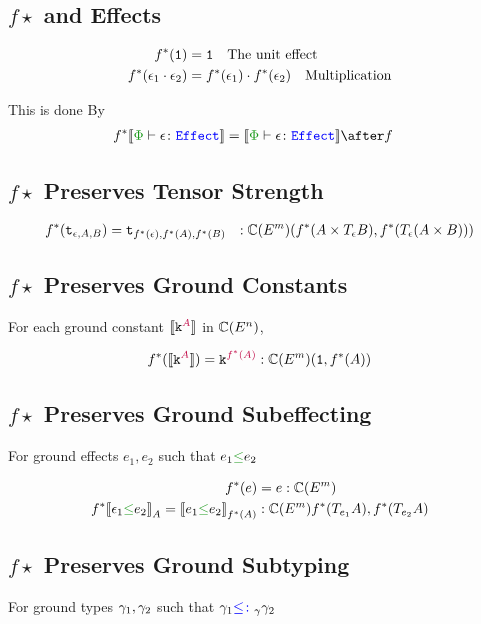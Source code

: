 \subsection{$f\star$ and Effects}
\begin{align*}
    f^*(\texttt{1}) &= \texttt{1} \quad\text{The unit effect}\\
    f^*(\epsilon_1\cdot\epsilon_2) &= f^*(\epsilon_1)\cdot f^*(\epsilon_2)\quad\text{Multiplication}\\
\end{align*}

This is done By
\begin{align*}
    f\star\deno{\typerelation{\P}{\e}{\effect}} & = \deno{\typerelation{\P}{\e}{\effect}}\after f
\end{align*}

\subsection{$f\star$ Preserves Tensor Strength}
\begin{align*}
    f^*(\texttt{t}_{\epsilon, A, B}) &= \texttt{t}_{f^*(\epsilon), f^*(A), f^*(B)} &: \mathbb{C}(E^m)(f^*(A\times T_{\epsilon}{B}), f^*(T_{\epsilon}{(A\times B)}))
\end{align*}
\subsection{$f\star$ Preserves Ground Constants}
For each ground constant ${\bf [\![}\texttt{k}^{\color{purple} A}{\bf ]\!]}$ in $\mathbb{C}(E^n)$,

\begin{align*}
    f^*({\bf [\![}\texttt{k}^{\color{purple} A}{\bf ]\!]}) = \texttt{k}^{\color{purple} f^*(A)} : \mathbb{C}(E^m)(\texttt{1}, f^*(A))
\end{align*}
\subsection{$f\star$ Preserves Ground Subeffecting}
For ground effects $e_1, e_2$ such that $e_1\subeffect e_2$



\begin{align*}
    f\star(e) & = e: \C(E^m)\\
    f\star\db{\e_1\subeffect e_2}_A = \db{e_1 \subeffect e_2}_{f\star(A)} &:\C(E^m){f\star(\T{e_1}{A}), f\star(\T{e_2}{A})} \\
\end{align*}
\subsection{$f\star$ Preserves Ground Subtyping}
For ground types $\gamma_1, \gamma_2$ such that $\gamma_1{\color{blue} \leq\colon}_\gamma\gamma_2$

